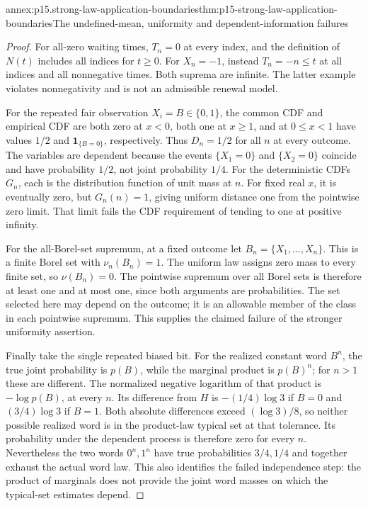 \begin{annexitem}{annex:p15.strong-law-application-boundaries}{thm:p15-strong-law-application-boundaries}{The undefined-mean, uniformity and dependent-information failures}
\begin{proof}
For all-zero waiting times, \(T_n=0\) at every index, and the
definition of \(N(t)\) includes all indices for \(t\geq0\).
For \(X_n=-1\), instead \(T_n=-n\leq t\) at all indices and
all nonnegative times. Both suprema are infinite. The latter example
violates nonnegativity and is not an admissible renewal model.

For the repeated fair observation \(X_i=B\in\{0,1\}\), the common
CDF and empirical CDF are both zero at \(x<0\), both one at
\(x\geq1\), and at \(0\leq x<1\) have values \(1/2\) and
\(\mathbf1_{\{B=0\}}\), respectively. Thus \(D_n=1/2\) for all
\(n\) at every outcome. The variables are dependent because the
events \(\{X_1=0\}\) and \(\{X_2=0\}\) coincide and have
probability \(1/2\), not joint probability \(1/4\).
For the deterministic CDFs \(G_n\), each is the distribution
function of unit mass at \(n\). For fixed real \(x\), it is
eventually zero, but \(G_n(n)=1\), giving uniform distance one
from the pointwise zero limit. That limit fails the CDF requirement
of tending to one at positive infinity.

For the all-Borel-set supremum, at a fixed outcome let
\(B_n=\{X_1,\ldots,X_n\}\). This is a finite Borel set with
\(\nu_n(B_n)=1\). The uniform law assigns zero mass to every
finite set, so \(\nu(B_n)=0\). The pointwise supremum over all
Borel sets is therefore at least one and at most one, since both
arguments are probabilities. The set selected here may depend on
the outcome; it is an allowable member of the class in each
pointwise supremum. This supplies the claimed failure of the
stronger uniformity assertion.

Finally take the single repeated biased bit. For the realized
constant word \(B^n\), the true joint probability is \(p(B)\),
while the marginal product is \(p(B)^n\); for \(n>1\) these
are different. The normalized negative logarithm of that product
is \(-\log p(B)\), at every \(n\).
Its difference from \(H\) is \(-(1/4)\log3\) if \(B=0\)
and \((3/4)\log3\) if \(B=1\). Both absolute differences exceed
\((\log3)/8\), so neither possible realized word is in the
product-law typical set at that tolerance. Its probability under
the dependent process is therefore zero for every \(n\).
Nevertheless the two words \(0^n,1^n\) have true probabilities
\(3/4,1/4\) and together exhaust the actual word law. This
also identifies the failed independence step: the product of
marginals does not provide the joint word masses on which the
typical-set estimates depend.
\end{proof}
\end{annexitem}
